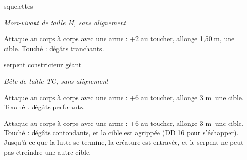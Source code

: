 \documentclass[a4paper,10pt,openany]{book}
\begin{document}
\begin{multicols}{2}
\begin{monsterbox}{squelettes}
	\begin{hangingpar}
		\textit{Mort-vivant de taille M, sans alignement}
	\end{hangingpar}
	\dndline%
	\basics[%
	armorclass = {18 (cuirasse, bouclier en acier)},
	hitpoints  = \dice{3d8+6},
	speed      = 9 m
	]
	\dndline%
	\stats[
	STR = \stat{10},
	DEX = \stat{14},
	CON = \stat{15},
	INT = \stat{6},
	WIS = \stat{8},
	CHA = \stat{5}
	]
	\dndline%
	\details[%
	damagevulnerabilities=contondant,
	damageimmunities=poison,
	conditionimmunities={épuisé, empoisonné},
	senses={Vision dans le noir à 18 m, Perception passive 9},
	challenge= 1/2
	]
	\dndline%
	\begin{monsteraction}
		Attaque au corps à corps avec une arme : +2 au toucher, allonge 1,50 m, une cible. Touché :  dégâts tranchants.
	\end{monsteraction}
\end{monsterbox}

\begin{monsterbox}{serpent constricteur géant}
	\begin{hangingpar}
		\textit{Bête de taille TG, sans alignement}
	\end{hangingpar}
	\dndline%
	\basics[%
	armorclass = 12,
	hitpoints  = \dice{8d12+8},
	speed      = {9 m, nage 9m}
	]
	\dndline%
	\stats[
	STR = \stat{19},
	DEX = \stat{14},
	CON = \stat{12},
	INT = \stat{1},
	CHA = \stat{3}
	]
	\dndline%
	\details[%
	skills=Perception +2,
	senses={Vision aveugle à 3 m, Perception passive 12},
	challenge= 2
	]
	\dndline%
	\begin{monsteraction}[Morsure]
		Attaque au corps à corps avec une arme : +6 au toucher, allonge 3 m, une cible. Touché :  dégâts perforants.
	\end{monsteraction}
	\begin{monsteraction}[Étreinte]
		Attaque au corps à corps avec une arme : +6 au toucher, allonge 3 m, une cible. Touché :  dégâts contondants, et la cible est agrippée
		(DD 16 pour s’échapper). Jusqu’à ce que la lutte se termine, la créature est entravée, et le serpent ne peut pas étreindre une autre cible.
	\end{monsteraction}
\end{monsterbox}


\end{multicols}
\end{document}
